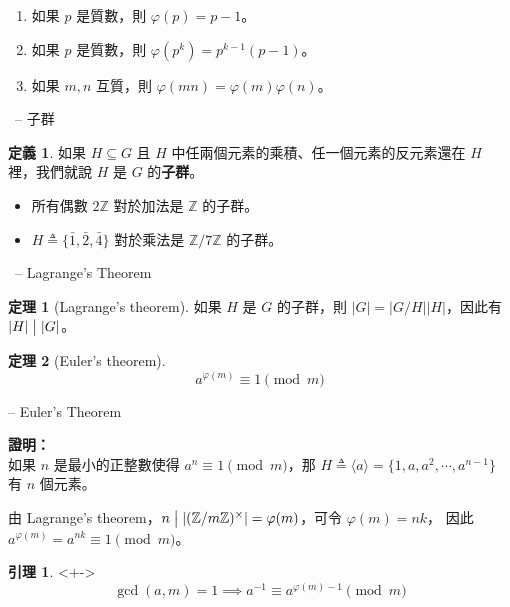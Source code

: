 \documentclass[notheorems,xcolor=dvipsnames]{beamer}
\newcommand\abs[1]{\left\lvert #1 \right\rvert}
\newcommand*{\defeq}{\triangleq}
\newcommand*{\bZ}{\mathbb{Z}}
\theoremstyle{definition}
\newtheorem{theorem}{定理}
\newtheorem{lemma}{引理}
\newtheorem{definition}{定義}
\renewenvironment{proof}{%
\begin{tcolorbox}[frame empty] {\bf 證明：}\ }{\end{tcolorbox}}
\renewcommand*{\emph}[1]{{\bf #1}}
\begin{document}
\begin{frame}
  \begin{enumerate}[<+->]
    \setlength{\itemsep}{3mm}
    \item 如果 $p$ 是質數，則 $\varphi(p) = p-1$。
    \item 如果 $p$ 是質數，則 $\varphi(p^k) = p^{k-1}(p-1)$。
    \item 如果 $m, n$ 互質，則 $\varphi(mn) = \varphi(m) \varphi(n)$。
  \end{enumerate}
\end{frame}

\begin{frame}[t]{\secname \ -- 子群}
  \begin{definition}
    如果 $H \subseteq G$ 且 $H$ 中任兩個元素的乘積、任一個元素的反元素還在 $H$ 裡，我們就說 $H$ 是 $G$ 的\emph{子群}。
  \end{definition}

  \begin{itemize}
    \item 所有偶數 $2 \bZ$ 對於加法是 $\bZ$ 的子群。
    \item $H \defeq \{\bar{1}, \bar2, \bar4\}$ 對於乘法是 $\bZ / 7\bZ$ 的子群。
  \end{itemize}
\end{frame}

\begin{frame}[t]{\secname \ -- Lagrange's Theorem}
  \begin{theorem}[Lagrange's theorem]
    如果 $H$ 是 $G$ 的子群，則 $\abs{G} = \abs{G / H} \abs{H}$，因此有 $\abs{H} \bigm\vert \abs{G}$。
  \end{theorem}
  \pause

  \bigskip
  \begin{theorem}[Euler's theorem] \vspace{-1em}
    \[ a^{\varphi(m)} \equiv 1 \pmod{m} \]
  \end{theorem}
\end{frame}

\begin{frame}[t]{{\secname} -- Euler's Theorem}
  \begin{proof} \\
    如果 $n$ 是最小的正整數使得 $a^n \equiv 1 \pmod{m}$，那
    $H \defeq \langle a \rangle = \{1, a, a^2, \cdots, a^{n-1}\}$ 有 $n$ 個元素。

    \smallskip
    由 Lagrange's theorem，$n \bigm\vert \abs{(\bZ / m\bZ)^{\times}} = \varphi(m)$，可令 $\varphi(m) = nk$，
    因此 $a^{\varphi(m)} = a^{nk} \equiv 1 \pmod{m}$。
  \end{proof}

  \begin{lemma}<+->
    \vspace{-1em}
    \[ \gcd(a, m) = 1 \implies a^{-1} \equiv a^{\varphi(m)-1} \pmod{m} \]
  \end{lemma}
\end{frame}
\end{document}
